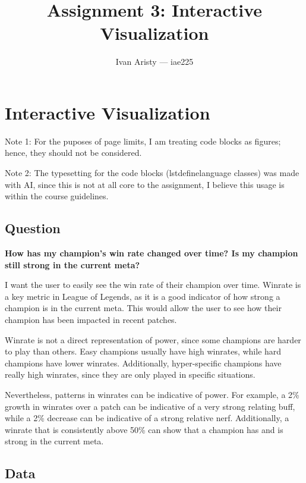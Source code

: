 \documentclass{article}
\title{Assignment 3: Interactive Visualization}
\author{Ivan Aristy — iae225}
\begin{document}
  \maketitle %
  \thispagestyle{empty}

\section{Interactive Visualization}
\label{sec:sec1}

Note 1: For the puposes of page limits,
I am treating code blocks as figures; 
hence, they should not be considered.

Note 2: The typesetting for the code blocks (lstdefinelanguage classes) 
was made with AI, since this is not at all core to the assignment,
I believe this usage is within the course guidelines.

\subsection{Question }
\label{subsec:subsec1}

\textbf{How has my champion's win rate changed over time? Is my champion still strong in the current meta?}

I want the user to easily see the win rate of their champion over time. 
Winrate is a key metric in League of Legends, as it is a good indicator of how strong a champion is in the current meta.
This would allow the user to see how their champion has been impacted in recent patches.

Winrate is not a direct representation of power, since some champions are harder to play than others.
Easy champions usually have high winrates, while hard champions have lower winrates.
Additionally, hyper-specific champions have really high winrates, since they are only played in specific situations.

Nevertheless, patterns in winrates can be indicative of power. For example, a 2\% growth in winrates
over a patch can be indicative of a very strong relating buff, while a 2\% decrease can be indicative of a strong relative nerf.
Additionally, a winrate that is consistently above 50\% can show that a champion has and is strong in the current meta.

\subsection{Data}
\label{subsec:subsec2}
\end{document}
